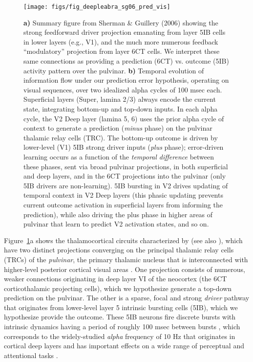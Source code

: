 \documentclass[11pt,twoside]{article}
\newif\myifpdf
\begin{document}
\begin{figure}
  \centering\texttt{[image: figs/fig\_deepleabra\_sg06\_pred\_vis]}
  \caption{{\bf a)} Summary figure from Sherman \& Guillery (2006) showing the strong feedforward driver projection emanating from layer 5IB cells in lower layers (e.g., V1), and the much more numerous feedback ``modulatory'' projection from layer 6CT cells.  We interpret these same connections as providing a prediction (6CT) vs. outcome (5IB) activity pattern over the pulvinar.  {\bf b)} Temporal evolution of information flow under our prediction error hypothesis, operating on visual sequences, over two idealized alpha cycles of 100 msec each.  Superficial layers (Super, lamina 2/3) always encode the current state, integrating bottom-up and top-down inputs.  In each alpha cycle, the V2 Deep layer (lamina 5, 6) uses the prior alpha cycle of context to generate a prediction (\emph{minus} phase) on the pulvinar thalamic relay cells (TRC). The bottom-up outcome is driven by lower-level (V1) 5IB strong driver inputs (\emph{plus} phase); error-driven learning occurs as a function of the \emph{temporal difference} between these phases, sent via broad pulvinar projections, in both superficial and deep layers, and in the 6CT projections into the pulvinar (only 5IB drivers are non-learning).  5IB bursting in V2 drives updating of temporal context in V2 Deep layers (this phasic updating prevents current outcome activation in superficial layers from informing the prediction), while also driving the plus phase in higher areas of pulvinar that learn to predict V2 activation states, and so on.}
  \label{fig.sg06}
\end{figure}

Figure~\ref{fig.sg06}a shows the thalamocortical circuits characterized by \citet{ShermanGuillery06} (see also \citealp{ShermanGuillery13,UsreySherman18}), which have two distinct projections converging on the principal thalamic relay cells (TRCs) of the \emph{pulvinar}, the primary thalamic nucleus that is interconnected with higher-level posterior cortical visual areas \citep{Shipp03,ArcaroPinskKastner15,HalassaKastner17}.  One projection consists of numerous, weaker connections originating in deep layer VI of the neocortex (the 6CT corticothalamic projecting cells), which we hypothesize generate a top-down prediction on the pulvinar.  The other is a sparse, focal \citep{Rockland98a,Rockland96} and strong \emph{driver} pathway that originates from lower-level layer 5 intrinsic bursting cells (5IB), which we hypothesize provide the outcome.  These 5IB neurons fire discrete bursts with intrinsic dynamics having a period of roughly 100 msec between bursts \citep{ConnorsGutnickPrince82,SilvaAmitaiConnors91,LarkumZhuSakmann99,FranceschettiGuatteoPanzicaEtAl95,SaalmannPinskWangEtAl12}, which corresponds to the widely-studied \emph{alpha} frequency of 10 Hz that originates in cortical deep layers and has important effects on a wide range of perceptual and attentional tasks \citep{BuffaloFriesLandmanEtAl11,VanRullenKoch03,MathewsonGrattonFabianiEtAl09,JensenBonnefondVanRullen12,ClaytonYeungKadosh18}.
\end{document}
